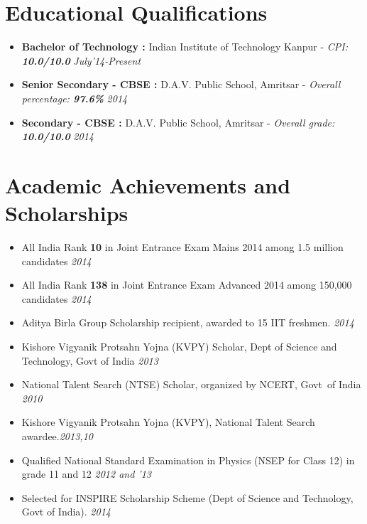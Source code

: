\documentclass[11pt,a4paper]{moderncv}
\newcommand{\education}[5]{
\item[] \textbf{\large{#1 :}} #2 - \emph{#3: \textbf{#4}} \hfill\textit{#5}
}
\newcommand{\onepage}[1]{
  \ifdefined\onep
  #1
  \fi
}
\newcommand{\twopage}[1]{
  \ifdefined\twop
  #1
  \fi
}
\newcommand{\secspace}{
  \onepage{\vspace{-0.27cm}}
  \twopage{\vspace{-0.07cm}}
}
\newcommand{\secbelow}{
  \onepage{\vspace{-0.07cm}}
}
\begin{document}
\maketitle
\onepage{\vspace{-1.4cm}}
\twopage{\vspace{-1cm}}
\section*{Educational Qualifications}
\secbelow
\begin{itemize}
  \twopage{\setlength\itemsep{0.2cm}}
  \education{Bachelor of Technology}{Indian Institute of Technology Kanpur}{CPI}{10.0/10.0}{July'14-Present}
  \education{Senior Secondary - CBSE}{D.A.V. Public School, Amritsar}{Overall percentage}{97.6\%}{2014}
  \education{Secondary - CBSE}{D.A.V. Public School, Amritsar}{Overall grade}{10.0/10.0}{2014}
\end{itemize}

\secspace
\section*{Academic Achievements and Scholarships}
\secbelow
\begin{itemize}
  \twopage{\setlength\itemsep{0.4em}}
\item All India Rank \textbf{10} in Joint Entrance Exam Mains 2014 among 1.5 million candidates              \hfill \textit{2014}
\item All India Rank \textbf{138} in Joint Entrance Exam Advanced 2014 among 150,000 candidates            	\hfill \textit{2014}
\item Aditya Birla Group Scholarship recipient, awarded to 15 IIT freshmen. \hfill \textit{2014}

  \twopage{
  \item Kishore Vigyanik Protsahn Yojna (KVPY) Scholar, Dept of Science and Technology, Govt of India
    \hfill \textit{2013}
  \item National Talent Search (NTSE) Scholar, organized by NCERT, Govt\ of India
    \hfill \textit{2010}}

  \onepage{\item Kishore Vigyanik Protsahn Yojna (KVPY), National Talent Search awardee.\hfill\textit{2013,10}}

  \twopage{
  \item Qualified National Standard Examination in Physics (NSEP for
    Class 12) in grade 11 and 12 \hfill \textit{2012 and '13}
  \item Selected for INSPIRE Scholarship Scheme (Dept of Science and Technology, Govt of India). \hfill \textit{2014}}

\end{itemize}
\end{document}

